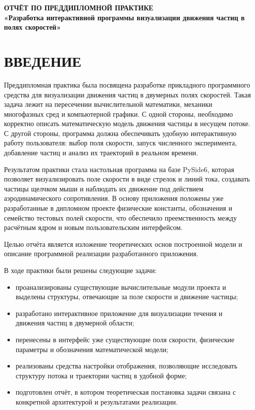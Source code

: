 \documentclass[14pt,a4paper]{extarticle}
\numberwithin{figure}{section}
\numberwithin{table}{section}
\begin{document}
\setlength{\emergencystretch}{2em}
\sloppy

\begin{center}
\textbf{ОТЧЁТ ПО ПРЕДДИПЛОМНОЙ ПРАКТИКЕ}\\[0.5\baselineskip]
\textbf{«Разработка интерактивной программы визуализации движения частиц в полях скоростей»}
\end{center}

\tableofcontents

\newpage
\section*{ВВЕДЕНИЕ}

Преддипломная практика была посвящена разработке прикладного программного
средства для визуализации движения частиц в двумерных полях скоростей. Такая
задача лежит на пересечении вычислительной математики, механики многофазных
сред и компьютерной графики. С одной стороны, необходимо корректно описать
математическую модель движения частицы в несущем потоке. С другой стороны,
программа должна обеспечивать удобную интерактивную работу пользователя: выбор
поля скорости, запуск численного эксперимента, добавление частиц и анализ их
траекторий в реальном времени.

Результатом практики стала настольная программа на базе PySide6, которая
позволяет визуализировать поле скорости в виде стрелок и линий тока, создавать
частицы щелчком мыши и наблюдать их движение под действием аэродинамического
сопротивления. В основу приложения положены уже разработанные в дипломном
проекте физические константы, обозначения и семейство тестовых полей скорости,
что обеспечило преемственность между расчётным ядром и новым пользовательским
интерфейсом.

Целью отчёта является изложение теоретических основ построенной модели и
описание программной реализации разработанного приложения.

В ходе практики были решены следующие задачи:
\begin{itemize}
    \item проанализированы существующие вычислительные модули проекта и выделены структуры, отвечающие за поле скорости и движение частицы;
    \item разработано интерактивное приложение для визуализации течения и движения частиц в двумерной области;
    \item перенесены в интерфейс уже существующие поля скорости, физические параметры и обозначения математической модели;
    \item реализованы средства настройки отображения, позволяющие исследовать структуру потока и траектории частиц в удобной форме;
    \item подготовлен отчёт, в котором теоретическая постановка задачи связана с конкретной архитектурой и результатами реализации.
\end{itemize}
\end{document}
